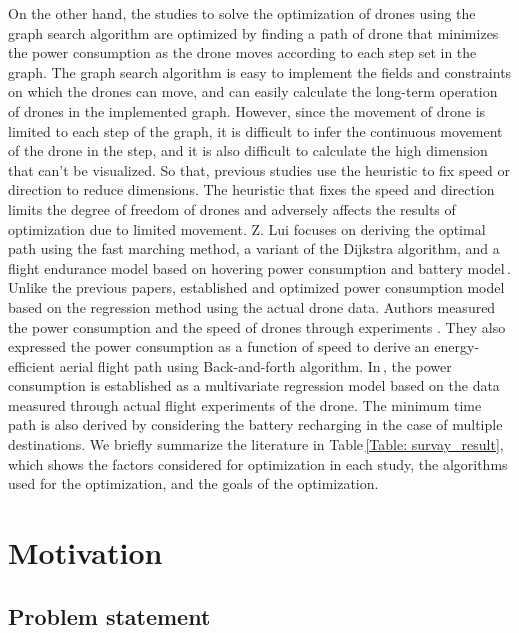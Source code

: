 \documentclass[journal]{./template/IEEEtran}
\begin{document}
On the other hand, the studies to solve the optimization of drones using the graph search algorithm are optimized by finding a path of drone that minimizes the power consumption as the drone moves according to each step set in the graph. 
The graph search algorithm is easy to implement the fields and constraints on which the drones can move, and can easily calculate the long-term operation of drones in the implemented graph.
However, since the movement of drone is limited to each step of the graph, it is difficult to infer the continuous movement of the drone in the step, and it is also difficult to calculate the high dimension that can’t be visualized.
So that, previous studies use the heuristic to fix speed or direction to reduce dimensions.
The heuristic that fixes the speed and direction limits the degree of freedom of drones and adversely affects the results of optimization due to limited movement.
Z. Lui focuses on deriving the optimal path using the fast marching method, a variant of the Dijkstra algorithm, and a flight endurance model based on hovering power consumption and battery model\,\cite{ref_10}.
Unlike the previous papers, \cite{ref_8,ref_9} established and optimized power consumption model based on the regression method using the actual drone data.
Authors measured the power consumption and the speed of drones through experiments \cite{ref_8}. They also expressed the power consumption as a function of speed to derive an energy-efficient aerial flight path using Back-and-forth algorithm.
In\,\cite{ref_9}, the power consumption is established as a multivariate regression model based on the data measured through actual flight experiments of the drone.
The minimum time path is also derived by considering the battery recharging in the case of multiple destinations. 
We briefly summarize the literature in Table\,\ref{Table: survay_result}, which shows the factors considered for optimization in each study, the algorithms used for the optimization, and the goals of the optimization.

\label{Section: Related works}









\section{Motivation}




\subsection{Problem statement}
\end{document}
